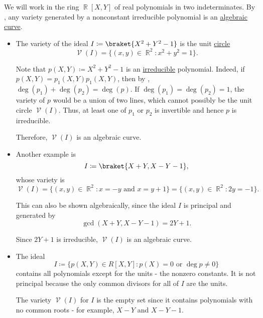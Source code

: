 \begin{example}\label{ex:affine_varieties}
  We will work in the ring \( \BbbR[X, Y] \) of real polynomials in two indeterminates. By , any variety generated by a nonconstant irreducible polynomial is an \hyperref[def:affine_variety/algebraic_curve]{algebraic curve}.

  \begin{itemize}
    \item The variety of the ideal \( I \coloneqq \braket{X^2 + Y^2 - 1} \) is the unit \hyperref[def:quadratic_plane_curve/ellipse]{circle}
          \begin{equation*}
            \mscrV(I) = \{ (x, y) \in \BbbR^2 \colon x^2 + y^2 = 1 \}.
          \end{equation*}

          Note that \( p(X, Y) \coloneqq X^2 + Y^2 - 1 \) is an \hyperref[def:irreducible_ring_element]{irreducible} polynomial. Indeed, if \( p(X, Y) = p_1(X, Y) p_1(X, Y) \), then by , \( \deg(p_1) + \deg(p_2) = \deg(p) \). If \( \deg(p_1) = \deg(p_2) = 1 \), the variety of \( p \) would be a union of two lines, which cannot possibly be the unit circle \( \mscrV(I) \). Thus, at least one of \( p_1 \) or \( p_2 \) is invertible and hence \( p \) is irreducible.

          Therefore, \( \mscrV(I) \) is an algebraic curve.

    \item Another example is
          \begin{equation*}
            I \coloneqq \braket{X + Y, X - Y - 1},
          \end{equation*}
          whose variety is
          \begin{equation*}
            \mscrV(I) = \{ (x, y) \in \BbbR^2 \colon x = -y \text{ and } x = y + 1 \} = \{ (x, y) \in \BbbR^2 \colon 2y = -1 \}.
          \end{equation*}

          This can also be shown algebraically, since the ideal \( I \) is principal and generated by
          \begin{equation*}
            \gcd(X + Y, X - Y - 1) = 2Y + 1.
          \end{equation*}

          Since \( 2Y + 1 \) is irreducible, \( \mscrV(I) \) is an algebraic curve.

    \item The ideal
          \begin{equation*}
            I \coloneqq \{ p(X, Y) \in R[X, Y] \colon p(X) = 0 \text{ or } \deg p \neq 0 \}
          \end{equation*}
          contains all polynomials except for the units - the nonzero constants. It is not principal because the only common divisors for all of \( I \) are the units.

          The variety \( \mscrV(I) \) for \( I \) is the empty set since it contains polynomials with no common roots - for example, \( X - Y \) and \( X - Y - 1 \).
  \end{itemize}
\end{example}

